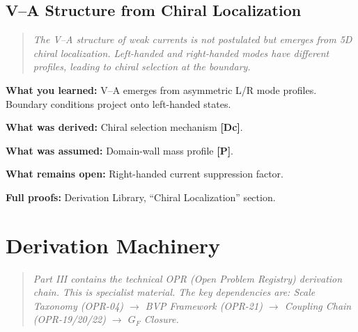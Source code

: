 \documentclass[11pt,a4paper]{book}
\theoremstyle{definition}
\theoremstyle{remark}
\newcommand{\tagDc}{\textcolor{calibratedColor}{\textbf{[Dc]}}}
\newcommand{\tagP}{\textcolor{postulatedColor}{\textbf{[P]}}}
\begin{document}
\chapter{V--A Structure from Chiral Localization}
\label{ch:va_structure}

\begin{quote}
\textit{The V--A structure of weak currents is not postulated but emerges from
5D chiral localization. Left-handed and right-handed modes have different profiles,
leading to chiral selection at the boundary.}
\end{quote}



\begin{chapterRecap}
\textbf{What you learned:} V--A emerges from asymmetric L/R mode profiles.
Boundary conditions project onto left-handed states.

\textbf{What was derived:} Chiral selection mechanism \tagDc{}.

\textbf{What was assumed:} Domain-wall mass profile \tagP{}.

\textbf{What remains open:} Right-handed current suppression factor.

\textbf{Full proofs:} Derivation Library, ``Chiral Localization'' section.
\end{chapterRecap}


\part{Derivation Machinery}
\label{part:machinery}

\begin{quote}
\textit{Part III contains the technical OPR (Open Problem Registry) derivation
chain. This is specialist material. The key dependencies are:
Scale Taxonomy (OPR-04) $\to$ BVP Framework (OPR-21) $\to$ Coupling Chain
(OPR-19/20/22) $\to$ $G_F$ Closure.}
\end{quote}

\end{document}
